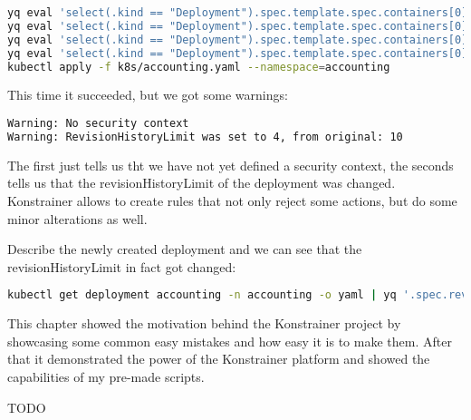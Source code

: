 \begin{lstlisting}[caption={TODO},language=bash,label=code:bashx]
yq eval 'select(.kind == "Deployment").spec.template.spec.containers[0].resources.limits.cpu = "500m"' k8s/accounting.yaml -i
yq eval 'select(.kind == "Deployment").spec.template.spec.containers[0].resources.limits.memory = "128Mi"' k8s/accounting.yaml -i
yq eval 'select(.kind == "Deployment").spec.template.spec.containers[0].resources.requests.cpu = "500m"' k8s/accounting.yaml -i
yq eval 'select(.kind == "Deployment").spec.template.spec.containers[0].resources.requests.memory = "128Mi"' k8s/accounting.yaml -i
kubectl apply -f k8s/accounting.yaml --namespace=accounting
\end{lstlisting}

This time it succeeded, but we got some warnings:

\begin{lstlisting}[caption={TODO},language=bash,label=code:todo]
Warning: No security context
Warning: RevisionHistoryLimit was set to 4, from original: 10
\end{lstlisting}

The first just tells us tht we have not yet defined a security context, the seconds tells us that the revisionHistoryLimit of the deployment was changed. Konstrainer allows to create rules that not only reject some actions, but do some minor alterations as well.

Describe the newly created deployment and we can see that the revisionHistoryLimit in fact got changed:

\begin{lstlisting}[caption={TODO},language=bash,label=code:bashx]
kubectl get deployment accounting -n accounting -o yaml | yq '.spec.revisionHistoryLimit'
\end{lstlisting}

This chapter showed the motivation behind the Konstrainer project by showcasing some common easy mistakes and how easy it is to make them. After that it demonstrated the power of the Konstrainer platform and showed the capabilities of my pre-made scripts. 




TODO
